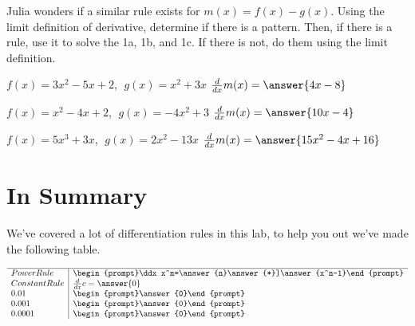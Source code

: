 \documentclass{ximera}
\begin{document}
\begin{question}
Julia wonders if a similar rule exists for $m(x) = f(x)-g(x)$. Using the limit definition of derivative, determine if there is a pattern. Then, if there is a rule, use it to solve the 1a, 1b, and 1c. If there is not, do them using the limit definition.

$f(x) = 3x^2 - 5x + 2$, $\;g(x) = x^2 + 3x$ \hspace{11mm} $\frac{d}{dx}m(x) =  \answer{4x-8}$

$f(x) = x^2 - 4x + 2$, $\;g(x) = -4x^2 + 3$ \hspace{10mm} $\frac{d}{dx}m(x) =  \answer{10x-4}$

$f(x) = 5x^3 + 3x$, $\;g(x) = 2x^2 - 13x$ \hspace{13mm} $\frac{d}{dx}m(x) =  \answer{15x^2-4x+16}$
\end{question}
\section{In Summary}
We've covered a lot of differentiation rules in this lab, to help you out we've made the following table.
\begin{question}
\[
\begin{array}{l|l}
\hline
   Power Rule&\begin{prompt}\ddx x^n=\answer{n}\answer{*}]\answer{x^n-1}\end{prompt}\\
  Constant Rule & \ddx c=\answer{0}\\
    0.01   & \begin{prompt}\answer{0}\end{prompt}\\
    0.001  & \begin{prompt}\answer{0}\end{prompt}\\
    0.0001 & \begin{prompt}\answer{0}\end{prompt}
\end{array}
\]
\end{question}

\pagebreak
\end{document}
